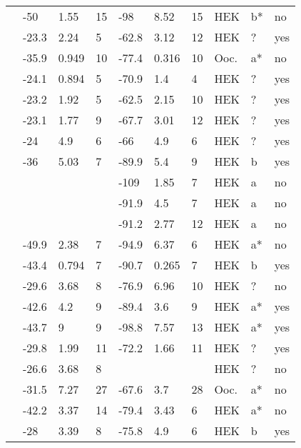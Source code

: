 \begin{footnotesize}
\begin{longtable}{p{5cm}|lll|lll|lll}
\citet{Pfahnl2007MutationDB} & -50 & 1.55 & 15 & -98 & 8.52 & 15 & HEK & b* & no \\
\citet{Rivolta2001MutationDB} & -23.3 & 2.24 & 5 & -62.8 & 3.12 & 12 & HEK & ? & yes \\
\citet{Rook1999MutationDB} & -35.9 & 0.949 & 10 & -77.4 & 0.316 & 10 & Ooc. & a* & no \\
\citet{Rossenbacker2004MutationDB} & -24.1 & 0.894 & 5 & -70.9 & 1.4 & 4 & HEK & ? & yes \\
\citet{Ruan2007MutationDB} & -23.2 & 1.92 & 5 & -62.5 & 2.15 & 10 & HEK & ? & yes \\
\citet{Ruan2010MutationDB} & -23.1 & 1.77 & 9 & -67.7 & 3.01 & 12 & HEK & ? & yes \\
\citet{Saber2015MutationDB} & -24 & 4.9 & 6 & -66 & 4.9 & 6 & HEK & ? & yes \\
\citet{Samani2009MutationDB} & -36 & 5.03 & 7 & -89.9 & 5.4 & 9 & HEK & b & yes \\
\citet{Sarhan2009MutationDB} & && & -109 & 1.85 & 7 & HEK & a & no \\
\citet{Shinlapawittayatorn2011aMutationDB} & && & -91.9 & 4.5 & 7 & HEK & a & no \\
\citet{Shinlapawittayatorn2011bMutationDB} & && & -91.2 & 2.77 & 12 & HEK & a & no \\
\citet{Shirai2002MutationDB} & -49.9 & 2.38 & 7 & -94.9 & 6.37 & 6 & HEK & a* & no \\
\citet{Shuraih2007MutationDB} & -43.4 & 0.794 & 7 & -90.7 & 0.265 & 7 & HEK & b & yes \\
\citet{Shy2014MutationDB} & -29.6 & 3.68 & 8 & -76.9 & 6.96 & 10 & HEK & ? & no \\
\citet{Smits2005aMutationDB} & -42.6 & 4.2 & 9 & -89.4 & 3.6 & 9 & HEK & a* & yes \\
\citet{Smits2005bMutationDB} & -43.7 & 9 & 9 & -98.8 & 7.57 & 13 & HEK & a* & yes \\
\citet{Sottas2013MutationDB} & -29.8 & 1.99 & 11 & -72.2 & 1.66 & 11 & HEK & ? & yes \\
\citet{Splawski2002MutationDB} & -26.6 & 3.68 & 8 & && & HEK & ? & no \\
\citet{Surber2008MutationDB} & -31.5 & 7.27 & 27 & -67.6 & 3.7 & 28 & Ooc. & a* & no \\
\citet{Surber2008MutationDB} & -42.2 & 3.37 & 14 & -79.4 & 3.43 & 6 & HEK & a* & no \\
\citet{Swan2014MutationDB} & -28 & 3.39 & 8 & -75.8 & 4.9 & 6 & HEK & b & yes \\

\end{longtable}
\end{footnotesize}
